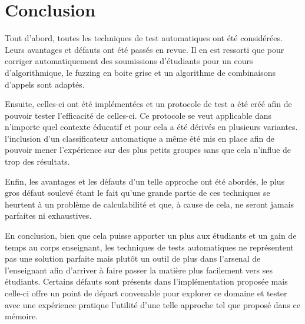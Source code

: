 \documentclass[a4paper]{report}
\begin{document}
\chapter{Conclusion}

Tout d'abord, toutes les techniques de test automatiques  ont été considérées.
Leurs avantages et défauts ont été passés en revue.
Il en est ressorti que pour corriger automatiquement des soumissions d'étudiants pour un cours d'algorithmique, le fuzzing en boite grise et un algorithme de combinaisons d'appels sont adaptés.

Ensuite, celles-ci ont été implémentées et un protocole de test a été créé afin de pouvoir tester l'efficacité de celles-ci.
Ce protocole se veut applicable dans n'importe quel contexte éducatif et pour cela a été dérivés en plusieurs variantes.
l'inclusion d'un classificateur automatique a même été mis en place afin de pouvoir mener l'expérience sur des plus petits groupes sans que cela n'influe de trop des résultats.

Enfin, les avantages et les défauts d'un telle approche ont été abordés, le plus gros défaut soulevé étant le fait qu'une grande partie de ces techniques se heurtent à un problème de calculabilité et que, à cause de cela, ne seront jamais parfaites ni exhaustives.

En conclusion, bien que cela puisse apporter un plus aux étudiants et un gain de temps au corps enseignant, les techniques de tests automatiques ne représentent pas une solution parfaite mais plutôt un outil de plus dans l'arsenal de l'enseignant afin d'arriver à faire passer la matière plus facilement vers ses étudiants.
Certains défauts sont présents dans l'implémentation proposée mais celle-ci offre un point de départ convenable pour explorer ce domaine et tester avec une expérience pratique l'utilité d'une telle approche tel que proposé dans ce mémoire.


 

\end{document}
